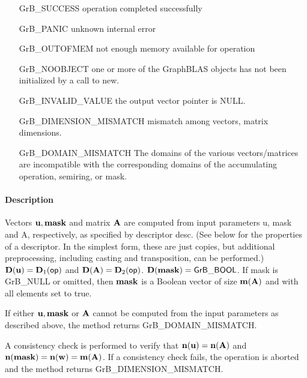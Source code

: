 \begin{itemize}[leftmargin=2.1in]
\item[{\sf GrB\_SUCCESS}]             operation completed successfully
\item[{\sf GrB\_PANIC}]               unknown internal error
\item[{\sf GrB\_OUTOFMEM}]            not enough memory available for operation
\item[{\sf GrB\_NOOBJECT}]          one or more of the GraphBLAS objects has
                                    not been initialized by a call to {\sf new}.
\item[{\sf GrB\_INVALID\_VALUE}]      the output vector pointer is {\sf NULL}.
\item[{\sf GrB\_DIMENSION\_MISMATCH}] mismatch among vectors, matrix dimensions.

	\item[{\sf GrB\_DOMAIN\_MISMATCH}]    The domains of the various
	vectors/matrices are incompatible with the corresponding domains of the
	accumulating operation, semiring, or mask.
\end{itemize}


\paragraph{Description}

Vectors ${\bf u}, {\bf mask}$ and matrix ${\bf A}$ are computed from
input parameters {\sf u}, {\sf mask} and {\sf A}, respectively, as specified
by descriptor {\sf desc}. (See below for the properties of a descriptor. In
the simplest form, these are just copies, but additional preprocessing,
including casting and transposition, can be performed.)  $\bold{D}({\bf u}) =
\bold{D}_1({\sf op})$ and $\bold{D}({\bf A}) = \bold{D}_2({\sf op})$.
$\bold{D}({\bf mask}) = {\sf GrB\_BOOL}$.  If {\sf mask} is {\sf GrB\_NULL} or omitted,
then ${\bf mask}$ is a Boolean vector of size $\bold{m}({\bf A})$
and with all elements set to {\sf true}.

If either ${\bf u}, {\bf mask}$ or ${\bf A}$ cannot be computed
from the input parameters as described above, the method returns {\sf
GrB\_DOMAIN\_MISMATCH}.

A consistency check is performed to verify that $\bold{n}({\bf u})
= \bold{n}({\bf A})$ and $\bold{n}({\bf mask}) =
\bold{n}({\bf w}) = \bold{m}({\bf A})$. If a consistency check fails, the operation is
aborted and the method returns {\sf GrB\_DIMENSION\_MISMATCH}.

